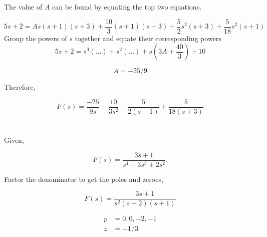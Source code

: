 \documentclass[12pt]{article}
\numberwithin{equation}{section}
\begin{document}
  The value of $ A $ can be found by equating the top two equations.

  \begin{equation}
    5s + 2 = As(s+1)(s+3) + \frac{10}{3}(s+1)(s+3) + \frac{5}{2}s^2 (s+3) + \frac{5}{18}s^2(s+1)
  \end{equation}
  Group the powers of $ s $ together and equate their corresponding powers
  \begin{equation}
    5s+2 = s^3 (\ldots) + s^2 (\ldots) + s(3A + \frac{40}{3}) + 10
  \end{equation}

  \begin{equation}
    A = -25/9
  \end{equation}

  Therefore,

  \begin{equation}
    F(s) = \frac{-25}{9s} + \frac{10}{3s^2} + \frac{5}{2(s + 1)} + \frac{5}{18(s + 3)}
  \end{equation}
  \section{}

  Given,

  \[
      F(s) = \frac{3s + 1}{s^4 + 3s^3 + 2s^2}
    .\]

  Factor the denominator to get the poles and zeroes,

  \begin{equation}
    F(s) = \frac{3s + 1}{s ^2 (s + 2)(s + 1)}
  \end{equation}

  \begin{align*}
    p &= 0,0,-2,-1 \\
    z &= -1/3
  \end{align*}
\end{document}
